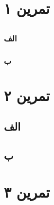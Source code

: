 \documentclass[]{article}
\begin{document}
\section*{تمرین ۱}

\subsection*{\color{blue}{جواب}}
\subsubsection*{الف}

\subsubsection*{ب}



\pagebreak
\section*{تمرین ۲}

\subsection*{\color{blue}{جواب}}
\subsection*{الف}

\subsection*{ب}


\pagebreak
\section*{تمرین ۳}

\end{document}
